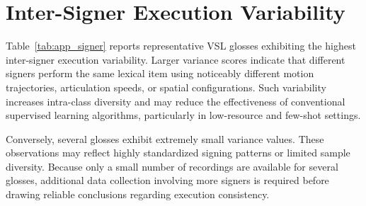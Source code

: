 \documentclass{ieeeaccess}
\begin{document}
\section{Inter-Signer Execution Variability}

Table~\ref{tab:app_signer} reports representative VSL glosses exhibiting the highest inter-signer execution variability. Larger variance scores indicate that different signers perform the same lexical item using noticeably different motion trajectories, articulation speeds, or spatial configurations. Such variability increases intra-class diversity and may reduce the effectiveness of conventional supervised learning algorithms, particularly in low-resource and few-shot settings.

Conversely, several glosses exhibit extremely small variance values. These observations may reflect highly standardized signing patterns or limited sample diversity. Because only a small number of recordings are available for several glosses, additional data collection involving more signers is required before drawing reliable conclusions regarding execution consistency.
\end{document}
